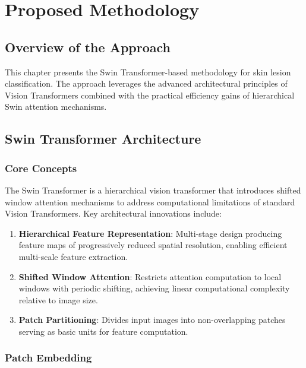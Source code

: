 \chapter{Proposed Methodology}
\label{ch:methodology}

\section{Overview of the Approach}

This chapter presents the Swin Transformer-based methodology for skin lesion classification. The approach leverages the advanced architectural principles of Vision Transformers combined with the practical efficiency gains of hierarchical Swin attention mechanisms.

\section{Swin Transformer Architecture}

\subsection{Core Concepts}

The Swin Transformer is a hierarchical vision transformer that introduces shifted window attention mechanisms to address computational limitations of standard Vision Transformers. Key architectural innovations include:

\begin{enumerate}
    \item \textbf{Hierarchical Feature Representation}: Multi-stage design producing feature maps of progressively reduced spatial resolution, enabling efficient multi-scale feature extraction.
    
    \item \textbf{Shifted Window Attention}: Restricts attention computation to local windows with periodic shifting, achieving linear computational complexity relative to image size.
    
    \item \textbf{Patch Partitioning}: Divides input images into non-overlapping patches serving as basic units for feature computation.
\end{enumerate}

\subsection{Patch Embedding}

